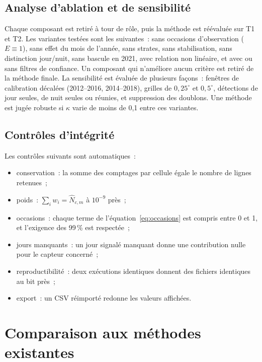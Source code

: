 \documentclass[11pt,a4paper]{article}
\begin{document}
\subsection{Analyse d'ablation et de sensibilité}\label{sec:ablation}

Chaque composant est retiré à tour de rôle, puis la méthode est réévaluée sur T1 et T2. Les variantes testées sont les suivantes~: sans occasions d'observation ($E\equiv1$), sans effet du mois de l'année, sans strates, sans stabilisation, sans distinction jour/nuit, sans bascule en 2021, avec relation non linéaire, et avec ou sans filtres de confiance. Un composant qui n'améliore aucun critère est retiré de la méthode finale. La sensibilité est évaluée de plusieurs façons~: fenêtres de calibration décalées (2012--2016, 2014--2018), grilles de $0{,}25^\circ$ et $0{,}5^\circ$, détections de jour seules, de nuit seules ou réunies, et suppression des doublons. Une méthode est jugée robuste si $\kappa$ varie de moins de 0,1 entre ces variantes.

\subsection{Contrôles d'intégrité}

Les contrôles suivants sont automatiques~:
\begin{itemize}
  \item conservation~: la somme des comptages par cellule égale le nombre de lignes retenues~;
  \item poids~: $\sum_i w_i = \hat N_{c,m}$ à $10^{-9}$ près~;
  \item occasions~: chaque terme de l'équation~\eqref{eq:occasions} est compris entre 0 et 1, et l'exigence des 99\,\% est respectée~;
  \item jours manquants~: un jour signalé manquant donne une contribution nulle pour le capteur concerné~;
  \item reproductibilité~: deux exécutions identiques donnent des fichiers identiques au bit près~;
  \item export~: un CSV réimporté redonne les valeurs affichées.
\end{itemize}

\section{Comparaison aux méthodes existantes}\label{sec:comparaison}
\end{document}
